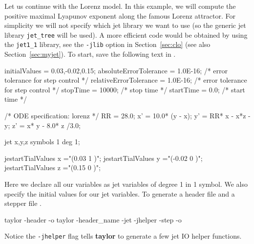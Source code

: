 \documentclass[10pt]{article}
\theoremstyle{remark}
\newcommand{\taylorname}{{\bf taylor}}
\newcommand{\inputfile}{}
\newcommand{\odecfile}{}
\newcommand{\odehfile}{}
\begin{document}
Let us continue with the Lorenz model. In this example, we will
compute the positive maximal Lyapunov exponent along the famous Lorenz
attractor. For simplicity we will not specify which jet library we want
to use (so the generic jet library \texttt{jet\_tree} will be used).
A more efficient code would be obtained by using the \texttt{jet1\_1}
library, see the \texttt{-jlib} option in Section~\ref{sec:clo}
(see also Section~\ref{sec:myjet}). To start,
save the following text in \inputfile{}.
\begin{code}[title={File: \inputfile{}}]
    initialValues = 0.03,-0.02,0.15;
    absoluteErrorTolerance = 1.0E-16;   /* error tolerance for step control */
    relativeErrorTolerance = 1.0E-16;   /* error tolerance for step control */
    stopTime = 10000;                   /* stop time */
    startTime = 0.0;                    /* start time */
    
    /* ODE specification:  lorenz */
    RR = 28.0;
    x' = 10.0* (y - x);
    y' = RR* x - x*z - y;
    z' = x* y - 8.0* z /3.0;
    
    jet x,y,z symbols 1 deg 1;
    
    jestartTialValues x ="(0.03   1 )";
    jestartTialValues y ="(-0.02  0 )";
    jestartTialValues z ="(0.15   0 )";
\end{code}
Here we declare all our variables as jet variables of degree 1 in 1
symbol. We also specify the initial values for our jet variables. To
generate a header file \odehfile{} and a stepper file \odecfile{}.
\begin{command}
    taylor -header -o \odehfile{} \inputfile{}
    taylor -header_name \odehfile{} -jet -jhelper -step -o \odecfile{} \inputfile{}
\end{command}
Notice the \verb+-jhelper+ flag tells \taylorname{} to generate a few
jet IO helper functions.
\end{document}
